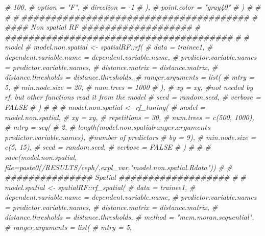 \documentclass[
]{article}
\newenvironment{Shaded}{\begin{snugshade}}{\end{snugshade}}
\newcommand{\CommentTok}[1]{\textcolor[rgb]{0.56,0.35,0.01}{\textit{#1}}}
\begin{document}
\begin{Shaded}
\begin{Highlighting}[]
\CommentTok{\#     100,}
\CommentTok{\#     option = "F",}
\CommentTok{\#     direction = {-}1}
\CommentTok{\#   ),}
\CommentTok{\#   point.color = "gray40"}
\CommentTok{\# )}
\CommentTok{\# }
\CommentTok{\# }
\CommentTok{\# }
\CommentTok{\# \#\#\#\#\#\#\#\#\#\#\#\#\#\#\#\#\#\#\#\#\#\#\#\#\#\#\#\#\#\#\#\#\#\#\#\#\#\#\#}
\CommentTok{\# \#\#\#\# Non spatial RF \#\#\#\#\#\#\#\#\#\#\#\#\#\#\#\#\#\#\#}
\CommentTok{\# \#\#\#\#\#\#\#\#\#\#\#\#\#\#\#\#\#\#\#\#\#\#\#\#\#\#\#\#\#\#\#\#\#\#\#\#\#\#\#}
\CommentTok{\# \# model}
\CommentTok{\# model.non.spatial \textless{}{-} spatialRF::rf(}
\CommentTok{\#   data = trainee1,}
\CommentTok{\#   dependent.variable.name = dependent.variable.name,}
\CommentTok{\#   predictor.variable.names = predictor.variable.names,}
\CommentTok{\#   distance.matrix = distance.matrix,}
\CommentTok{\#   distance.thresholds = distance.thresholds,}
\CommentTok{\#   ranger.arguments = list(}
\CommentTok{\#     mtry = 5,}
\CommentTok{\#     min.node.size = 20,}
\CommentTok{\#     num.trees = 1000}
\CommentTok{\#   ),}
\CommentTok{\#   xy = xy, \#not needed by rf, but other functions read it from the model}
\CommentTok{\#   seed = random.seed,}
\CommentTok{\#   verbose = FALSE}
\CommentTok{\# )}
\CommentTok{\# }
\CommentTok{\# }
\CommentTok{\# model.non.spatial \textless{}{-} rf\_tuning(}
\CommentTok{\#   model = model.non.spatial,}
\CommentTok{\#   xy = xy,}
\CommentTok{\#   repetitions = 30,}
\CommentTok{\#   num.trees = c(500, 1000),}
\CommentTok{\#   mtry = seq(}
\CommentTok{\#     2,}
\CommentTok{\#     length(model.non.spatial$ranger.arguments$predictor.variable.names), \#number of predictors}
\CommentTok{\#     by = 9),}
\CommentTok{\#   min.node.size = c(5, 15),}
\CommentTok{\#   seed = random.seed,}
\CommentTok{\#   verbose = FALSE}
\CommentTok{\# )}
\CommentTok{\# }
\CommentTok{\# \# save(model.non.spatial, file=paste0(\textquotesingle{}/RESULTS/ceph/\textquotesingle{},expl\_var,"model.non.spatial.Rdata"))}
\CommentTok{\# }
\CommentTok{\# \#\#\#\#\#\#\#\#\#\#\#\#\#\#\# Spatial \#\#\#\#\#\#\#\#\#\#\#\#\#\#\#\#\#\#\#}
\CommentTok{\# }
\CommentTok{\#   model.spatial \textless{}{-} spatialRF::rf\_spatial(}
\CommentTok{\#       data = trainee1,}
\CommentTok{\#       dependent.variable.name = dependent.variable.name,}
\CommentTok{\#       predictor.variable.names = predictor.variable.names,}
\CommentTok{\#       distance.matrix = distance.matrix,}
\CommentTok{\#       distance.thresholds = distance.thresholds,}
\CommentTok{\#       method = "mem.moran.sequential",}
\CommentTok{\#       ranger.arguments = list(}
\CommentTok{\#         mtry = 5,}

\end{Highlighting}
\end{Shaded}
\end{document}
